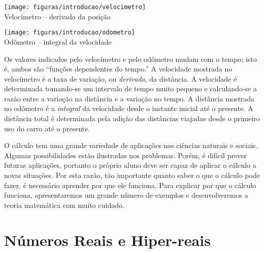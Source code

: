 \documentclass{svmono}
\begin{document}
\vspace{0.5\baselineskip}
\begin{minipage}{0.5\textwidth}
\begin{center}
\texttt{[image: figuras/introducao/velocimetro]}\\
Velocímetro -- derivada da posição
\end{center}
\end{minipage}%
\begin{minipage}{0.5\textwidth}
\begin{center}
\texttt{[image: figuras/introducao/odometro]}\\
Odômetro -- integral da velocidade
\end{center}
\end{minipage}
\vspace{0.5\baselineskip}

Os valores indicados pelo velocímetro e pelo odômetro mudam com o tempo;
isto é, ambos são ``funções dependentes do tempo.'' A velocidade mostrada
no velocímetro é a taxa de variação, ou \emph{derivada}, da distância.
A velocidade é determinada tomando-se um intervalo de tempo muito
pequeno e calculando-se a razão entre a variação na distância e a
variação no tempo. A distância mostrada no odômetro é a
\emph{integral} da velocidade desde o instante inicial até o presente. 
A distância total é determinada pela adição das distâncias viajadas desde
o primeiro uso do carro até o presente.

O cálculo tem uma grande variedade de aplicações nas ciências naturais e
sociais. Algumas possibilidades estão ilustradas nos problemas.
Porém, é difícil prever futuras aplicações, portanto o próprio aluno
deve ser capaz de aplicar o cálculo a novas situações. Por esta razão, tão
importante quanto saber o que o cálculo pode fazer, é necessário aprender
por que ele funciona.
Para explicar por que o cálculo funciona, apresentaremos um grande número
de exemplos e desenvolveremos a teoria matemática com muito cuidado.

\mainmatter

\chapter{Números Reais e Hiper-reais}
\label{chp:reals}
\end{document}
